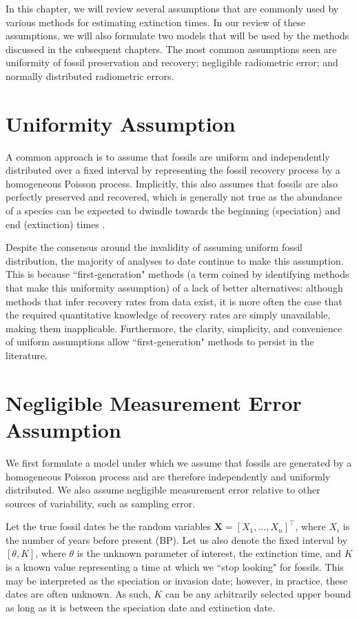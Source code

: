
In this chapter, we will review several assumptions that are commonly used by various methods for estimating extinction times. In our review of these assumptions, we will also formulate two models that will be used by the methods discussed in the subsequent chapters. The most common assumptions seen are uniformity of fossil preservation and recovery; negligible radiometric error; and normally distributed radiometric errors.

\section{Uniformity Assumption}

A common approach is to assume that fossils are uniform and independently distributed over a fixed interval by representing the fossil recovery process by a homogeneous Poisson process. Implicitly, this also assumes that fossils are also perfectly preserved and recovered, which is generally not true as the abundance of a species can be expected to dwindle towards the beginning (speciation) and end (extinction) times \cite{Lee2010, WangMarshall2016}. 

Despite the consensus around the invalidity of assuming uniform fossil distribution, the majority of analyses to date continue to make this assumption. This is because ``first-generation" methods (a term coined by \citet{WangMarshall2016} identifying methods that make this uniformity assumption) of a lack of better alternatives: although methods that infer recovery rates from data exist, it is more often the case that the required quantitative knowledge of recovery rates are simply unavailable, making them inapplicable. Furthermore, the clarity, simplicity, and convenience of uniform assumptions allow ``first-generation" methods to persist in the literature.

\section{Negligible Measurement Error Assumption}

We first formulate a model under which we assume that fossils are generated by a homogeneous Poisson process and are therefore independently and uniformly distributed. We also assume negligible measurement error relative to other sources of variability, such as sampling error.

Let the true fossil dates be the random variables $\bm{X} = [X_1, \dots, X_n]^\top$, where $X_i$ is the number of years before present (BP). Let us also denote the fixed interval by $[\theta, K]$, where $\theta$ is the unknown parameter of interest, the extinction time, and $K$ is a known value representing a time at which we ``stop looking" for fossils. This may be interpreted as the speciation or invasion date; however, in practice, these dates are often unknown. As such, $K$ can be any arbitrarily selected upper bound as long as it is between the speciation date and extinction date.

